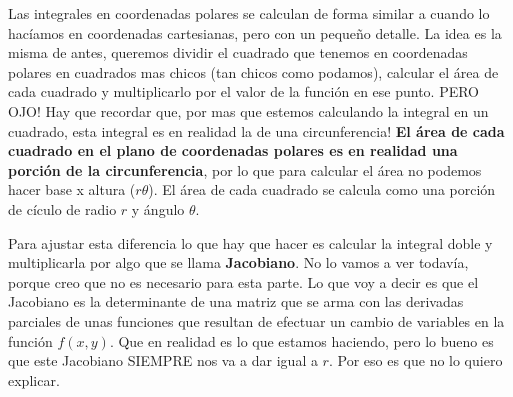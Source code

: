 \documentclass[12pt]{article}
\begin{document}
Las integrales en coordenadas polares se calculan de forma similar a cuando lo hacíamos en coordenadas cartesianas, pero con un pequeño detalle. La idea es la misma de antes, queremos dividir el cuadrado que tenemos en coordenadas polares en cuadrados mas chicos (tan chicos como podamos), calcular el área de cada cuadrado y multiplicarlo por el valor de la función en ese punto. PERO OJO! Hay que recordar que, por mas que estemos calculando la integral en un cuadrado, esta integral es en realidad la de una circunferencia! \textbf{El área de cada cuadrado en el plano de coordenadas polares es en realidad una porción de la circunferencia}, por lo que para calcular el área no podemos hacer base x altura ($ r\theta $). El área de cada cuadrado se calcula como una porción de cículo de radio $ r $ y ángulo $ \theta $.

%
%

Para ajustar esta diferencia lo que hay que hacer es calcular la integral doble y multiplicarla por algo que se llama \textbf{Jacobiano}. No lo vamos a ver todavía, porque creo que no es necesario para esta parte. Lo que voy a decir es que el Jacobiano es la determinante de una matriz que se arma con las derivadas parciales de unas funciones que resultan de efectuar un cambio de variables en la función $ f(x,y) $. Que en realidad es lo que estamos haciendo, pero lo bueno es que este Jacobiano SIEMPRE nos va a dar igual a $ r $. Por eso es que no lo quiero explicar.
\end{document}
